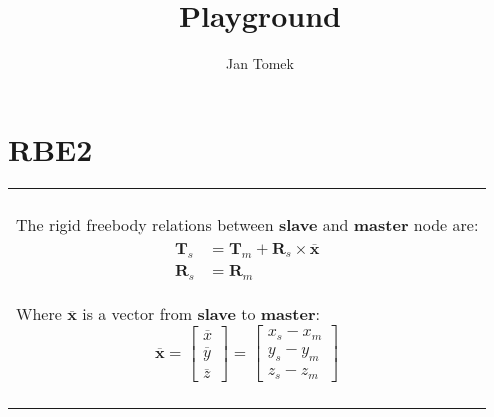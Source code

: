 \documentclass[10pt,b5paper,titlepage]{book}
\author{Jan Tomek}
\title{\bf Playground}
\newcommand{\m}{\mathbf}
\newenvironment{bbox}[1][0.96]
{
    \begin{center}
        \begin{tabular}{|p{#1\textwidth}|}
            \hline\\
}
{
            \\\\\hline
        \end{tabular}
    \end{center}
}
\newenvironment{eqarray}
{
    \begin{eqnarray}
        \begin{aligned}
}
{
        \end{aligned}
    \end{eqnarray}
}
\begin{document}
\maketitle

\chapter{RBE2}

\begin{bbox}[0.95]
    The rigid freebody relations between \textbf{slave} and \textbf{master} node are:
    \begin{eqarray}
        \m{T}_s &= \m{T}_m + \m{R}_s \times \overline{\m{x}} \\
        \m{R}_s &= \m{R}_m
    \end{eqarray}

    Where $ \overline{\m{x}} $ is a vector from \textbf{slave} to \textbf{master}:
    \begin{equation}
        \overline{\m{x}} =
        \begin{bmatrix}
            \overline{x} \\
            \overline{y} \\
            \overline{z}
        \end{bmatrix} =
        \begin{bmatrix}
            x_s - x_m \\
            y_s - y_m \\
            z_s - z_m
        \end{bmatrix}
    \end{equation}


\end{bbox}
\end{document}
